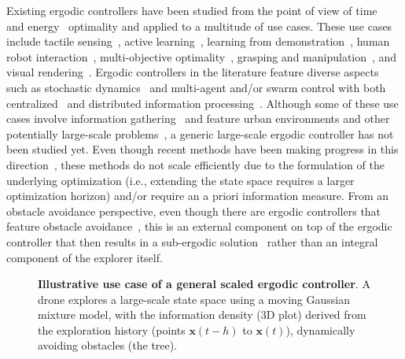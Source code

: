 \documentclass[letterpaper,10pt,conference,twoside]{IEEEtran}
\theoremstyle{definition}
\begin{document}
Existing ergodic controllers have been studied from the point of view of time~\cite{dong2023time} and energy~\cite{seewald2024energy,naveed2024eclares} optimality and applied to a multitude of use cases. These use cases include tactile sensing~\cite{abraham2017ergodic}, active learning~\cite{abraham2021ergodic}, learning from demonstration~\cite{kalinowska2021learning}, human robot interaction~\cite{fitzsimons2019ergodicity,fitzsimons2022ergodic}, multi-objective optimality~\cite{ren2023pareto,srinivasan2023multi}, grasping and manipulation~\cite{shetty2022ergodic,bilaloglu2023whole}, and visual rendering~\cite{low2022drozbot,prabhakar2020autonomous}. Ergodic controllers in the literature feature diverse aspects such as stochastic dynamics~\cite{torre2016ergodic,ayvali2017ergodic} and multi-agent and/or swarm control with both centralized~\cite{seewald2024energy,rao2024learning} and distributed information processing~\cite{prabhakar2020ergodic,coffin2022multi}. Although some of these use cases involve information gathering~\cite{dressel2018optimality} and feature urban environments and other potentially large-scale problems~\cite{prabhakar2020ergodic,rao2023multi}, a generic large-scale ergodic controller has not been studied yet. Even though recent methods have been making progress in this direction~\cite{whittemeyer2023bi,seewald2024energy,naveed2024eclares,dong2023time}, these methods do not scale efficiently due to the formulation of the underlying optimization (i.e., extending the state space requires a larger optimization horizon) and/or require an a priori information measure. From an obstacle avoidance perspective, even though there are ergodic controllers that feature obstacle avoidance~\cite{lerch2023safety,prabhakar2020ergodic}, this is an external component on top of the ergodic controller that then results in a sub-ergodic solution~\cite{dong2023time} rather than an integral component of the explorer itself.

\begin{figure}
  \centering
  
  \caption{\textbf{Illustrative use case of a general scaled ergodic controller}. A drone explores a large-scale state space using a moving Gaussian mixture model, with the information density (3D plot) derived from the exploration history (points $\mathbf{x}(t-h)$ to $\mathbf{x}(t)$), dynamically avoiding obstacles (the tree).}
  \vspace*{-.1cm}
\end{figure}
\end{document}
